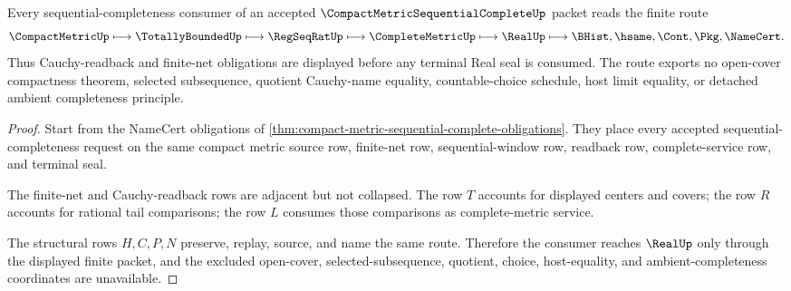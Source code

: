\begin{theorem}
\label{thm:compact-metric-sequential-complete-readback-route}
Every sequential-completeness consumer of an accepted $\CompactMetricSequentialCompleteUp$ packet reads the finite route
$$
\CompactMetricUp
\longmapsto
\TotallyBoundedUp
\longmapsto
\RegSeqRatUp
\longmapsto
\CompleteMetricUp
\longmapsto
\RealUp
\longmapsto
\BHist,\hsame,\Cont,\Pkg,\NameCert .
$$
Thus Cauchy-readback and finite-net obligations are displayed before any terminal Real seal is consumed. The route exports no open-cover compactness theorem, selected subsequence, quotient Cauchy-name equality, countable-choice schedule, host limit equality, or detached ambient completeness principle.
\end{theorem}
\begin{proof}
Start from the NameCert obligations of \autoref{thm:compact-metric-sequential-complete-obligations}. They place every accepted sequential-completeness request on the same compact metric source row, finite-net row, sequential-window row, readback row, complete-service row, and terminal seal.

The finite-net and Cauchy-readback rows are adjacent but not collapsed. The row $T$ accounts for displayed centers and covers; the row $R$ accounts for rational tail comparisons; the row $L$ consumes those comparisons as complete-metric service.

The structural rows $H,C,P,N$ preserve, replay, source, and name the same route. Therefore the consumer reaches $\RealUp$ only through the displayed finite packet, and the excluded open-cover, selected-subsequence, quotient, choice, host-equality, and ambient-completeness coordinates are unavailable.
\end{proof}


